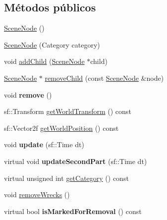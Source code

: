 \subsection*{Métodos públicos}
\begin{DoxyCompactItemize}
\item 
\hyperlink{classSceneNode_acc2e7940323560ba86dad8e2d6eb6690}{Scene\+Node} ()
\item 
\hyperlink{classSceneNode_af87e82dcbe9fc195a557bc91a4b16317}{Scene\+Node} (Category category)
\item 
void \hyperlink{classSceneNode_a0e5790af868dcf846f37630094850fd7}{add\+Child} (\hyperlink{classSceneNode}{Scene\+Node} $\ast$child)
\item 
\hyperlink{classSceneNode}{Scene\+Node} $\ast$ \hyperlink{classSceneNode_a6fe848553acf7282b1faf6aaad3eb1b8}{remove\+Child} (const \hyperlink{classSceneNode}{Scene\+Node} \&node)
\item 
\hypertarget{classSceneNode_ae2571967539aec81b7131c793e7af3ed}{}void {\bfseries remove} ()\label{classSceneNode_ae2571967539aec81b7131c793e7af3ed}

\item 
sf\+::\+Transform \hyperlink{classSceneNode_a88be3d3c93c80ee4a7ba25024d2414ec}{get\+World\+Transform} () const 
\item 
sf\+::\+Vector2f \hyperlink{classSceneNode_a410150636d06294c7a9e238d8c4f07b5}{get\+World\+Position} () const 
\item 
\hypertarget{classSceneNode_a132fa45a0a23ba86b76247273a16cfce}{}void {\bfseries update} (sf\+::\+Time dt)\label{classSceneNode_a132fa45a0a23ba86b76247273a16cfce}

\item 
\hypertarget{classSceneNode_a6c42640df0126ae10c4fa02d3bbfd509}{}virtual void {\bfseries update\+Second\+Part} (sf\+::\+Time dt)\label{classSceneNode_a6c42640df0126ae10c4fa02d3bbfd509}

\item 
virtual unsigned int \hyperlink{classSceneNode_a46b4d2304c0e3e8e18235959f51689d9}{get\+Category} () const 
\item 
void \hyperlink{classSceneNode_a4ab07dfa68f4094e2e9152b6f4869794}{remove\+Wrecks} ()
\item 
\hypertarget{classSceneNode_a7c07379dc7bd3165843607beb6287ef9}{}virtual bool {\bfseries is\+Marked\+For\+Removal} () const \label{classSceneNode_a7c07379dc7bd3165843607beb6287ef9}


\end{DoxyCompactItemize}
